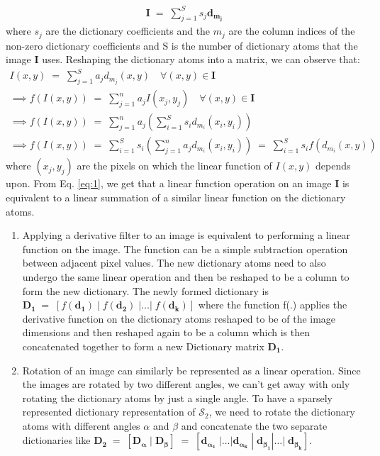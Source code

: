 \documentclass[11pt]{article}
\begin{document}
\begin{enumerate}
\begin{gather}
    \mathbf{I}\;=\;\sum_{j=1}^Ss_j\mathbf{d_{m_j}}
\end{gather}
where $s_j$ are the dictionary coefficients and the $m_j$ are the column indices of the non-zero dictionary coefficients and S is the number of dictionary atoms that the image \textbf{I} uses. Reshaping the dictionary atoms into a matrix, we can observe that:
\begin{gather}
    I(x,y)\;=\;\sum_{j=1}^Sa_jd_{m_j}(x,y)\quad\forall(x,y)\in\mathbf{I}\\
    \implies f(I(x,y))\;=\;\sum_{j=1}^na_jI(x_j,y_j)\quad\forall(x,y)\in\mathbf{I}\nonumber\\
    \implies f(I(x,y))\;=\;\sum_{j=1}^na_j\left(\sum_{i=1}^Ss_id_{m_i}(x_i, y_i)\right)\nonumber\\
    \implies f(I(x,y))\;=\;\sum_{i=1}^Ss_i\left(\sum_{j=1}^na_jd_{m_i}(x_i, y_i)\right)\;=\;\sum_{i=1}^Ss_if(d_{m_i}(x, y))
    \label{eq:1}
\end{gather}
where $(x_j, y_j)$ are the pixels on which the linear function of $I(x,y)$ depends upon. 
From Eq. \ref{eq:1}, we get that a linear function operation on an image $\mathbf{I}$ is equivalent to a linear summation of a similar linear function on the dictionary atoms.
\begin{enumerate}
    \item Applying a derivative filter to an image is equivalent to performing a linear function on the image. The function can be a simple subtraction operation between adjacent pixel values. The new dictionary atoms need to also undergo the same linear operation and then be reshaped to be a column to form the new dictionary. The newly formed dictionary is  $\mathbf{D_1}\;=\;[f(\mathbf{d_1})\;|\;f(\mathbf{d_2})\;|\dots|\;f(\mathbf{d_k})]$ where the function f(.) applies the derivative function on the dictionary atoms reshaped to be of the image dimensions and then reshaped again to be a column which is then concatenated together to form a new Dictionary matrix $\mathbf{D_1}$.
    
    \item Rotation of an image can similarly be represented as a linear operation. Since the images are rotated by two different angles, we can't get away with only rotating the dictionary atoms by just a single angle. To have a sparsely represented dictionary representation of $\mathcal{S}_2$, we need to rotate the dictionary atoms with different angles $\alpha$ and $\beta$ and concatenate the two separate dictionaries like $\mathbf{D_2}\;=\;[\mathbf{D_\alpha}\;|\;\mathbf{D_\beta}]\;=\;[\mathbf{d_{\alpha_1}}\;|\dots|\mathbf{d_{\alpha_k}}\;|\;\mathbf{d_{\beta_1}}|\dots|\;\mathbf{d_{\beta_k}}]$.
    

\end{enumerate}
\end{enumerate}
\end{document}
